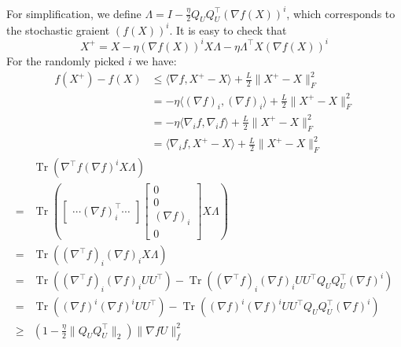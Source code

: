\documentclass[letterpaper]{article} %
\DeclareMathOperator{\Tr}{Tr} %
\begin{document}
For simplification, we define $\Lambda=I-\frac{\eta}{2}Q_UQ_U^\top(\nabla f(X))^i$, which corresponds to the stochastic graient $(f(X))^i$. It is easy to check that 
\begin{equation}
X^+=X-\eta(\nabla f(X))^iX\Lambda-\eta\Lambda^\top X(\nabla f(X))^i
\end{equation}
For the randomly picked $i$ we have:
\begin{equation}
\begin{split}
f(X^+)-f(X)&\le\langle\nabla f, X^+-X\rangle+\frac{L}{2}\|X^+-X\|_F^2\\
&=-\eta\langle(\nabla f)_i, (\nabla f)_i\rangle+\frac{L}{2}\|X^+-X\|_F^2\\
&=-\eta\langle\nabla_i f, \nabla_i f\rangle+\frac{L}{2}\|X^+-X\|_F^2\\
&=\langle\nabla_i f, X^+-X\rangle+\frac{L}{2}\|X^+-X\|_F^2
\end{split}
\end{equation}
\begin{equation}
	\begin{split}
		&\Tr(\nabla^\top f(\nabla f)^iX\Lambda)\\
		=&\Tr(
		\begin{bmatrix}
		\cdots(\nabla f)^\top_i\cdots 
		\end{bmatrix}
		\begin{bmatrix}
			0 \\0 \\(\nabla f)_i\\	0 
		\end{bmatrix}X\Lambda)\\
		=&\Tr( (\nabla^\top f)_i(\nabla f)_i X\Lambda)\\
		=&\Tr( (\nabla^\top f)_i(\nabla f)_i UU^\top)-\Tr( (\nabla^\top f)_i(\nabla f)_i UU^\top Q_UQ^\top_U(\nabla f)^i)\\
		=&\Tr( (\nabla f)^i(\nabla f)^i UU^\top)-\Tr( (\nabla f)^i(\nabla f)^i UU^\top Q_UQ^\top_U(\nabla f)^i)\\
		\ge& (1-\frac{\eta}{2}\|Q_UQ_U^\top\|_2)\|\nabla f U\|_f^2
	\end{split}
\end{equation}
\end{document}
